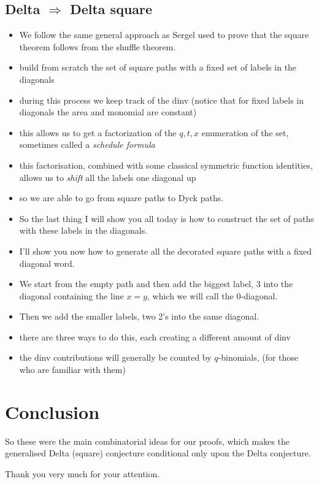 \documentclass[12pt]{article}
\begin{document}
    \subsection{Delta $\Rightarrow$ Delta square}
        \begin{itemize}
            \item We follow the same general approach as Sergel used to prove that the square theorem follows from the shuffle theorem.
            \item build from scratch the set of square paths with a fixed set of labels in the diagonals
            \item during this process we keep track of the dinv (notice that for fixed labels in diagonals the area and monomial are constant)
            \item this allows us to get a factorization of the $q,t,x$ enumeration of the set, sometimes called a \emph{schedule formula}
            \item this factorisation, combined with some classical symmetric function identities, allows us to \emph{shift} all the labels one diagonal up
            \item so we are able to go from square paths to Dyck paths.
            \item So the last thing I will show you all today is how to construct the set of paths with these labels in the diagonals.
            \item I'll show you now how to generate all the decorated square paths with a fixed diagonal word. 
            \item We start from the empty path and then add the biggest label, 3 into the diagonal containing the line $x=y$, which we will call the $0$-diagonal. 
            \item Then we add the smaller labels, two 2's into the same diagonal.
            \item there are three ways to do this, each creating a different amount of dinv
            \item  the dinv contributions will generally be counted by $q$-binomials, (for those who are familiar with them)
        \end{itemize}
    
    \section{Conclusion}
    So these were the main combinatorial ideas for our proofs, which makes the generalised Delta (square) conjecture conditional only upon the Delta conjecture.

    Thank you very much for your attention. 
\end{document}
